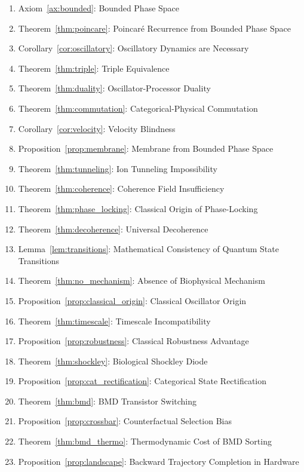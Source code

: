 \documentclass[twocolumn,10pt,a4paper]{article}
\theoremstyle{definition}
\theoremstyle{remark}
\begin{document}
\begin{enumerate}
    \item Axiom~\ref{ax:bounded}: Bounded Phase Space
    \item Theorem~\ref{thm:poincare}: Poincar\'{e} Recurrence from Bounded Phase Space
    \item Corollary~\ref{cor:oscillatory}: Oscillatory Dynamics are Necessary
    \item Theorem~\ref{thm:triple}: Triple Equivalence
    \item Theorem~\ref{thm:duality}: Oscillator-Processor Duality
    \item Theorem~\ref{thm:commutation}: Categorical-Physical Commutation
    \item Corollary~\ref{cor:velocity}: Velocity Blindness
    \item Proposition~\ref{prop:membrane}: Membrane from Bounded Phase Space
    \item Theorem~\ref{thm:tunneling}: Ion Tunneling Impossibility
    \item Theorem~\ref{thm:coherence}: Coherence Field Insufficiency
    \item Theorem~\ref{thm:phase_locking}: Classical Origin of Phase-Locking
    \item Theorem~\ref{thm:decoherence}: Universal Decoherence
    \item Lemma~\ref{lem:transitions}: Mathematical Consistency of Quantum State Transitions
    \item Theorem~\ref{thm:no_mechanism}: Absence of Biophysical Mechanism
    \item Proposition~\ref{prop:classical_origin}: Classical Oscillator Origin
    \item Theorem~\ref{thm:timescale}: Timescale Incompatibility
    \item Proposition~\ref{prop:robustness}: Classical Robustness Advantage
    \item Theorem~\ref{thm:shockley}: Biological Shockley Diode
    \item Proposition~\ref{prop:cat_rectification}: Categorical State Rectification
    \item Theorem~\ref{thm:bmd}: BMD Transistor Switching
    \item Proposition~\ref{prop:crossbar}: Counterfactual Selection Bias
    \item Theorem~\ref{thm:bmd_thermo}: Thermodynamic Cost of BMD Sorting
    \item Proposition~\ref{prop:landscape}: Backward Trajectory Completion in Hardware

\end{enumerate}
\end{document}
